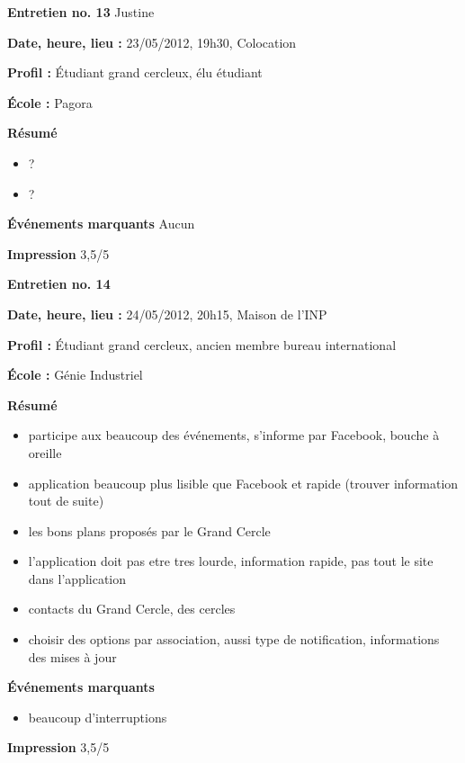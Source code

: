 \documentclass[a4paper, 11px]{article}
\begin{document}
\vspace{.3cm}

 \textbf {\large Entretien no. 13}
Justine

\textbf{Date, heure, lieu : }
23/05/2012, 19h30, Colocation

\textbf{Profil : }
Étudiant grand cercleux, élu étudiant

\textbf{École : }
Pagora

\textbf{Résumé}
	\begin{itemize}
		\item ?
		\item ?
	\end{itemize}

\textbf{Événements marquants}
Aucun

\textbf{Impression}
3,5/5



\vspace{.3cm}

 \textbf {\large Entretien no. 14}

\textbf{Date, heure, lieu : }
24/05/2012, 20h15, Maison de l'INP

\textbf{Profil : }
Étudiant grand cercleux, ancien membre bureau international

\textbf{École : }
Génie Industriel

\textbf{Résumé}
	\begin{itemize}
		\item participe aux beaucoup des événements, s'informe par Facebook, bouche à oreille
		\item application beaucoup plus lisible que Facebook et rapide (trouver information tout de suite)
		\item les bons plans proposés par le Grand Cercle
		\item l'application doit pas etre tres lourde, information rapide, pas tout le site dans l'application
		\item contacts du Grand Cercle, des cercles
		\item choisir des options par association, aussi type de notification, informations des mises à jour
	\end{itemize}

\textbf{Événements marquants}
	\begin{itemize}
		\item beaucoup d'interruptions
	\end{itemize}

\textbf{Impression}
3,5/5
\end{document}
